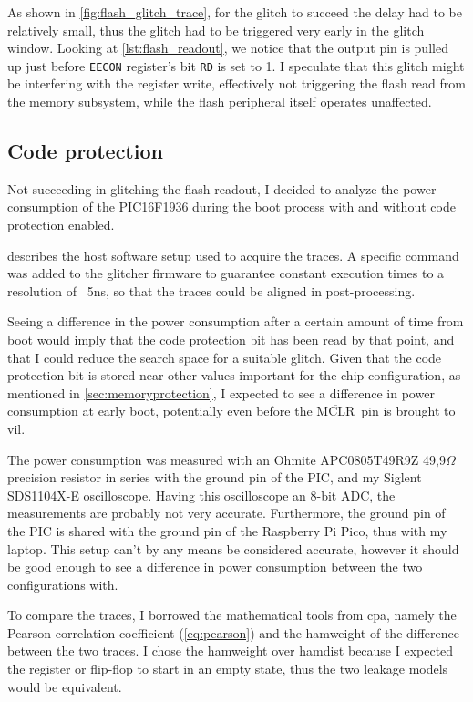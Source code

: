 \documentclass[a4paper,english,twoside,10pt]{article}
\newcommand{\mclr}{\(\overline{\mbox{MCLR}}\)\ }
\begin{document}
As shown in \cref{fig:flash_glitch_trace}, for the glitch to succeed the delay had to be relatively small, thus the glitch had to be triggered very early in the glitch window. Looking at \cref{lst:flash_readout}, we notice that the output pin is pulled up just before \texttt{EECON} register's bit \texttt{RD} is set to 1. I speculate that this glitch might be interfering with the register write, effectively not triggering the flash read from the memory subsystem, while the flash peripheral itself operates unaffected.

\subsection{Code protection}\label{sect:codeprotection}
Not succeeding in glitching the flash readout, I decided to analyze the power consumption of the PIC16F1936 during the boot process with and without code protection enabled.

 describes the host software setup used to acquire the traces. A specific command was added to the glitcher firmware to guarantee constant execution times to a resolution of ~5ns, so that the traces could be aligned in post-processing.

Seeing a difference in the power consumption after a certain amount of time from boot would imply that the code protection bit has been read by that point, and that I could reduce the search space for a suitable glitch. Given that the code protection bit is stored near other values important for the chip configuration, as mentioned in \cref{sec:memoryprotection}, I expected to see a difference in power consumption at early boot, potentially even before the \mclr pin is brought to \gls{vil}.

The power consumption was measured with an Ohmite APC0805T49R9Z 49,9$\Omega$ precision resistor in series with the ground pin of the PIC, and my Siglent SDS1104X-E oscilloscope. Having this oscilloscope an 8-bit ADC, the measurements are probably not very accurate. Furthermore, the ground pin of the PIC is shared with the ground pin of the Raspberry Pi Pico, thus with my laptop. This setup can't by any means be considered accurate, however it should be good enough to see a difference in power consumption between the two configurations with.

To compare the traces, I borrowed the mathematical tools from \gls{cpa}, namely the Pearson correlation coefficient (\cref{eq:pearson}) and the \gls{hamweight} of the difference between the two traces. I chose the \gls{hamweight} over \gls{hamdist} because I expected the register or flip-flop to start in an empty state, thus the two leakage models would be equivalent.
\end{document}
